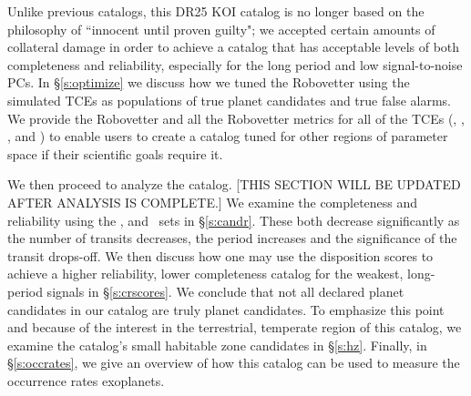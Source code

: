 Unlike previous catalogs, this DR25 KOI catalog is no longer based on the philosophy of ``innocent until proven guilty"; we accepted certain amounts of collateral damage in order to achieve a catalog that has acceptable levels of both completeness and reliability, especially for the long period and low signal-to-noise PCs. In \S\ref{s:optimize} we discuss how we tuned the Robovetter using the simulated TCEs as populations of true planet candidates and true false alarms. We provide the Robovetter and all the Robovetter metrics for all of the TCEs (\opstce, \injtce, \invtce, and \scrtce) to enable users to create a catalog tuned for other regions of parameter space if their scientific goals require it. 

We then proceed to analyze the catalog. [THIS SECTION WILL BE UPDATED AFTER ANALYSIS IS COMPLETE.] We examine the completeness and reliability using the \injtce, \invtce and \scrtce\ sets in \S\ref{s:candr}. These both decrease significantly as the number of transits decreases, the period increases and the significance of the transit drops-off.  We then discuss how one may use the disposition scores to achieve a higher reliability, lower completeness catalog for the weakest, long-period signals in \S\ref{s:crscores}.  We conclude that not all declared planet candidates in our catalog are truly planet candidates. To emphasize this point and because of the interest in the terrestrial, temperate region of this catalog, we examine the catalog's small habitable zone candidates in \S\ref{s:hz}. Finally, in \S\ref{s:occrates}, we give an overview of how this catalog can be used to measure the occurrence rates exoplanets.





